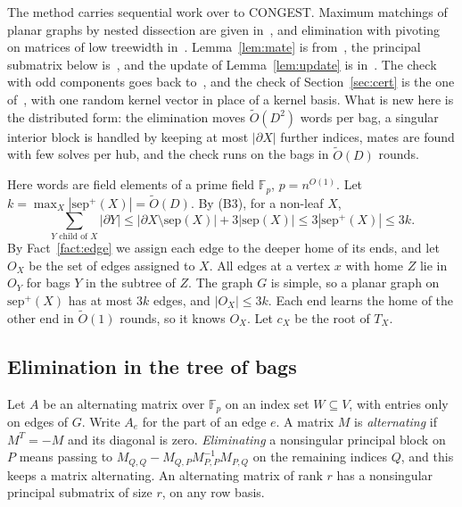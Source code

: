 \documentclass[11pt]{article}
\theoremstyle{definition}
\theoremstyle{remark}
\theoremstyle{plain}
\newcommand{\Ot}{\tilde O}
\newcommand{\sep}{\mathrm{sep}}
\newcommand{\F}{\mathbb{F}}
\begin{document}
The method carries sequential work over to CONGEST. Maximum matchings of planar graphs by nested dissection are given in~\cite{MS06},
and elimination with pivoting on matrices of low treewidth in~\cite{FLPSW18}. Lemma~\ref{lem:mate} is from~\cite{RV89}, the principal
submatrix below is~\cite[Theorem 5.6]{FLPSW18}, and the update of Lemma~\ref{lem:update} is in~\cite[Theorem 7, Section 4.3]{MS06}. The
check with odd components goes back to~\cite{Kar86}, and the check of Section~\ref{sec:cert} is the one
of~\cite[Section 3.1, Theorem 3.4]{Che97}, with one random kernel vector in place of a kernel basis. What is new here is the distributed
form: the elimination moves $\Ot(D^2)$ words per bag, a singular interior block is handled by keeping at most $|\partial X|$ further
indices, mates are found with few solves per hub, and the check runs on the bags in $\Ot(D)$ rounds.


Here words are field elements of a prime field $\F_p$, $p=n^{O(1)}$. Let $k=\max_X|\sep^+(X)|=\Ot(D)$. By (B3), for a non-leaf $X$,
\begin{equation}\label{eq:sumpartial}
\sum_{Y\text{ child of }X}|\partial Y|\le|\partial X\setminus\sep(X)|+3|\sep(X)|\le3|\sep^+(X)|\le3k.
\end{equation}
By Fact~\ref{fact:edge} we assign each edge to the deeper home of its ends, and let $O_X$ be the set of edges assigned to $X$. All edges at a vertex
$x$ with home $Z$ lie in $O_Y$ for bags $Y$ in the subtree of $Z$. The graph $G$ is simple, so a planar graph on $\sep^+(X)$ has at most $3k$ edges, and
$|O_X|\le3k$. Each end learns the home of the other end in $\Ot(1)$ rounds, so it knows $O_X$. Let $c_X$ be the root of $T_X$.

\subsection{Elimination in the tree of bags}

Let $A$ be an alternating matrix over $\F_p$ on an index set $W\subseteq V$, with entries only on edges of $G$. Write $A_e$ for the part of an edge $e$. A matrix $M$ is \emph{alternating} if $M^T=-M$ and its diagonal is zero. \emph{Eliminating} a nonsingular principal block on $P$ means passing to $M_{Q,Q}-M_{Q,P}M_{P,P}^{-1}M_{P,Q}$ on the remaining indices $Q$, and this keeps a matrix alternating. An alternating
matrix of rank $r$ has a nonsingular principal submatrix of size $r$, on any row basis.
\end{document}
